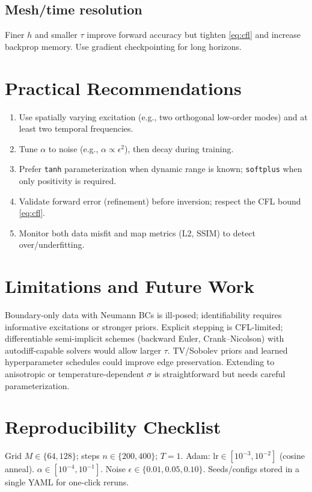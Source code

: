 \documentclass[11pt,a4paper]{article}
\numberwithin{equation}{section}
\begin{document}
\subsection{Mesh/time resolution}
Finer $h$ and smaller $\tau$ improve forward accuracy but tighten \eqref{eq:cfl} and increase backprop memory. 
Use gradient checkpointing for long horizons.

\section{Practical Recommendations}
\begin{enumerate}[leftmargin=1.25em]
  \item Use spatially varying excitation (e.g., two orthogonal low-order modes) and at least two temporal frequencies.
  \item Tune $\alpha$ to noise (e.g., $\alpha \propto \epsilon^2$), then decay during training.
  \item Prefer \texttt{tanh} parameterization when dynamic range is known; \texttt{softplus} when only positivity is required.
  \item Validate forward error (refinement) before inversion; respect the CFL bound \eqref{eq:cfl}.
  \item Monitor both data misfit and map metrics (L2, SSIM) to detect over/underfitting.
\end{enumerate}

\section{Limitations and Future Work}
Boundary-only data with Neumann BCs is ill-posed; identifiability requires informative excitations or stronger priors. 
Explicit stepping is CFL-limited; differentiable semi-implicit schemes (backward Euler, Crank--Nicolson) with autodiff-capable solvers would allow larger $\tau$.
TV/Sobolev priors and learned hyperparameter schedules could improve edge preservation.
Extending to anisotropic or temperature-dependent $\sigma$ is straightforward but needs careful parameterization.

\section{Reproducibility Checklist}
Grid $M\in\{64,128\}$; steps $n\in\{200,400\}$; $T=1$. 
Adam: $\text{lr}\in[10^{-3},10^{-2}]$ (cosine anneal). 
$\alpha\in[10^{-4},10^{-1}]$.
Noise $\epsilon\in\{0.01,0.05,0.10\}$.
Seeds/configs stored in a single YAML for one-click reruns.
\end{document}
